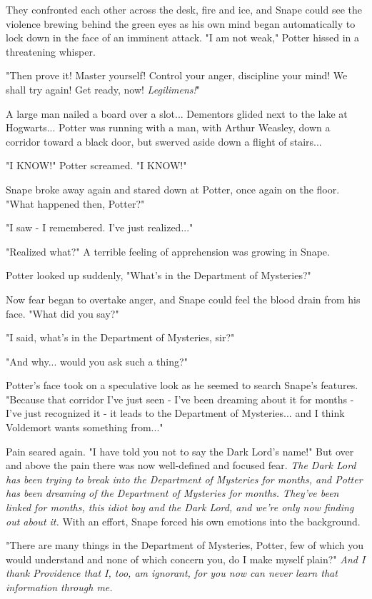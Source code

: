 \documentclass[a4paper,11pt]{article}
\begin{document}
They confronted each other across the desk, fire and ice, and Snape could see the violence brewing behind the green eyes as his own mind began automatically to lock down in the face of an imminent attack. "I am not weak," Potter hissed in a threatening whisper.

"Then prove it! Master yourself! Control your anger, discipline your mind! We shall try again! Get ready, now! \emph{Legilimens!}"

A large man nailed a board over a slot... Dementors glided next to the lake at Hogwarts... Potter was running with a man, with Arthur Weasley, down a corridor toward a black door, but swerved aside down a flight of stairs...

"I KNOW!" Potter screamed. "I KNOW!"

Snape broke away again and stared down at Potter, once again on the floor. "What happened then, Potter?"

"I saw - I remembered. I've just realized..."

"Realized what?" A terrible feeling of apprehension was growing in Snape.

Potter looked up suddenly, "What's in the Department of Mysteries?"

Now fear began to overtake anger, and Snape could feel the blood drain from his face. "What did you say?"

"I said, what's in the Department of Mysteries, sir?"

"And why... would you ask such a thing?"

Potter's face took on a speculative look as he seemed to search Snape's features. "Because that corridor I've just seen - I've been dreaming about it for months - I've just recognized it - it leads to the Department of Mysteries... and I think Voldemort wants something from..."

Pain seared again. "I have told you not to say the Dark Lord's name!" But over and above the pain there was now well-defined and focused fear. \emph{The Dark Lord has been trying to break into the Department of Mysteries for months, and Potter has been dreaming of the Department of Mysteries for months. They've been linked for months, this idiot boy and the Dark Lord, and we're only now finding out about it.} With an effort, Snape forced his own emotions into the background.

"There are many things in the Department of Mysteries, Potter, few of which you would understand and none of which concern you, do I make myself plain?" \emph{And I thank Providence that I, too, am ignorant, for you now can never learn that information through me.}
\end{document}
